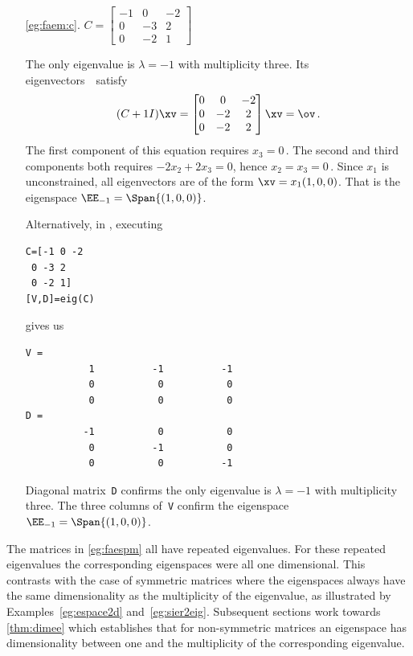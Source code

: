 \begin{example}
\begin{itemize}
\item[\ref{eg:faem:c}.]
\(C=\begin{bmatrix}-1&0&-2
\\0&-3&2
\\0&-2&1\end{bmatrix}\)
\begin{solution} 
The only eigenvalue is \(\lambda=-1\) with multiplicity three.
Its eigenvectors~\xv\ satisfy
\begin{equation*}
(C+1 I)\xv=\begin{bmatrix} 0&0&-2
\\0&-2&2
\\0&-2&2 \end{bmatrix}\xv=\ov\,.
\end{equation*}
The first component of this equation requires \(x_3=0\)\,.  
The second and third components both requires \(-2x_2+2x_3=0\), hence \(x_2=x_3=0\)\,.
Since \(x_1\) is unconstrained, all eigenvectors are of the form \(\xv=x_1(1,0,0)\).  
That is the eigenspace  \(\EE_{-1}=\Span\{(1,0,0)\}\).

Alternatively, in \script, executing 
\begin{verbatim}
C=[-1 0 -2
 0 -3 2
 0 -2 1]
[V,D]=eig(C)
\end{verbatim}
gives us
\begin{verbatim}
V =
           1          -1          -1
           0           0           0
           0           0           0
D =
          -1           0           0
           0          -1           0
           0           0          -1
\end{verbatim}
Diagonal matrix~\verb|D| confirms the only eigenvalue is \(\lambda=-1\) with multiplicity three.  
The three columns of~\verb|V| confirm the eigenspace \(\EE_{-1}=\Span\{(1,0,0)\}\).
\end{solution}

\end{itemize}
\end{example}

The matrices in \autoref{eg:faespm} all have repeated eigenvalues.  
For these repeated eigenvalues the corresponding eigenspaces were all one dimensional.
This contrasts with the case of symmetric matrices where the eigenspaces always have the same dimensionality as the multiplicity of the eigenvalue, as illustrated by Examples~\ref{eg:espace2d} and~\ref{eg:sier2eig}.
Subsequent sections work towards \autoref{thm:dimee} which establishes that for non-symmetric matrices an eigenspace has dimensionality between one and the multiplicity of the corresponding eigenvalue.


